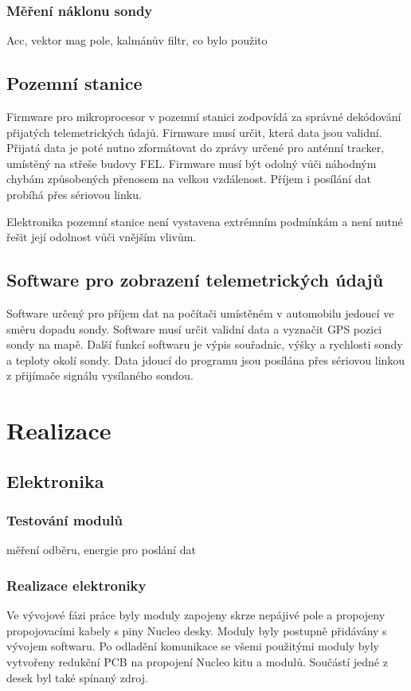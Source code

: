 \documentclass[twoside]{ctuthesis}
\theoremstyle{plain}
\theoremstyle{definition}
\theoremstyle{note}
\begin{document}
		\subsection{Měření náklonu sondy}
		Acc, vektor mag pole, kalmánův filtr, co bylo použito

	
	\section{Pozemní stanice}
	Firmware pro mikroprocesor v pozemní stanici zodpovídá za správné dekódování přijatých telemetrických údajů. Firmware musí určit, která data jsou validní. Přijatá data je poté nutno zformátovat do zprávy určené pro anténní tracker, umístěný na střeše budovy FEL. Firmware musí být odolný vůči náhodným chybám způsobených přenosem na velkou vzdálenost. Příjem i posílání dat probíhá přes sériovou linku. 

	Elektronika pozemní stanice není vystavena extrémním podmínkám a není nutné řešit její odolnost vůči vnějším vlivům. 

	\section{Software pro zobrazení telemetrických údajů}
	Software určený pro příjem dat na počítači umístěném v automobilu jedoucí ve směru dopadu sondy. Software musí určit validní data a vyznačit GPS pozici sondy na mapě. Další funkcí softwaru je výpis souřadnic, výšky a rychlosti sondy a teploty okolí sondy. Data jdoucí do programu jsou posílána přes sériovou linkou z přijímače signálu vysílaného sondou. 


\chapter{Realizace}

	\section{Elektronika}
		\subsection{Testování modulů}
		měření odběru, energie pro poslání dat

		\subsection{Realizace elektroniky}
		Ve vývojové fázi práce byly moduly zapojeny skrze nepájivé pole a propojeny propojovacími kabely s piny Nucleo desky. Moduly byly postupně přidávány s vývojem softwaru. Po odladění komunikace se všemi použitými moduly byly vytvořeny redukční PCB na propojení Nucleo kitu a modulů. Součástí jedné z desek byl také spínaný zdroj. 
\end{document}
